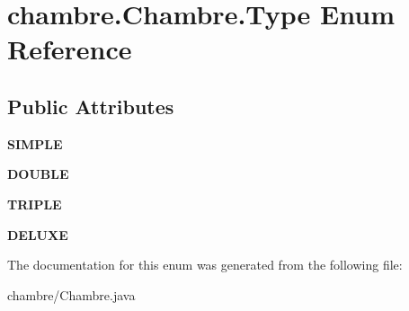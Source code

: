 \hypertarget{enumchambre_1_1_chambre_1_1_type}{}\section{chambre.\+Chambre.\+Type Enum Reference}
\label{enumchambre_1_1_chambre_1_1_type}
\subsection*{Public Attributes}
\begin{DoxyCompactItemize}
\item 
{\bfseries S\+I\+M\+P\+LE}\hypertarget{enumchambre_1_1_chambre_1_1_type_a44db5823d5fc785987b83ae518e5a342}{}\label{enumchambre_1_1_chambre_1_1_type_a44db5823d5fc785987b83ae518e5a342}

\item 
{\bfseries D\+O\+U\+B\+LE}\hypertarget{enumchambre_1_1_chambre_1_1_type_a7e460a526ecc53a9b32250702f3e96c5}{}\label{enumchambre_1_1_chambre_1_1_type_a7e460a526ecc53a9b32250702f3e96c5}

\item 
{\bfseries T\+R\+I\+P\+LE}\hypertarget{enumchambre_1_1_chambre_1_1_type_ad4a2f13632c8378f272f736d8271854c}{}\label{enumchambre_1_1_chambre_1_1_type_ad4a2f13632c8378f272f736d8271854c}

\item 
{\bfseries D\+E\+L\+U\+XE}\hypertarget{enumchambre_1_1_chambre_1_1_type_ac20161c0b39a9629de12b8113b85cba8}{}\label{enumchambre_1_1_chambre_1_1_type_ac20161c0b39a9629de12b8113b85cba8}

\end{DoxyCompactItemize}


The documentation for this enum was generated from the following file\+:\begin{DoxyCompactItemize}
\item 
chambre/Chambre.\+java\end{DoxyCompactItemize}
